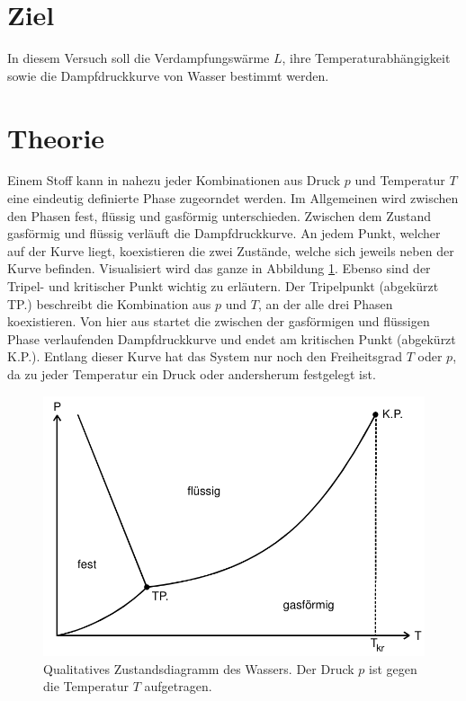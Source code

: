 \section{Ziel}
In diesem Versuch soll die Verdampfungswärme $L$, ihre Temperaturabhängigkeit sowie die Dampfdruckkurve
von Wasser bestimmt werden.
\section{Theorie}
\label{sec:Theorie}
Einem Stoff kann in nahezu jeder Kombinationen aus Druck $p$ und Temperatur $T$ eine eindeutig definierte Phase zugeorndet werden.
Im Allgemeinen wird zwischen den Phasen fest, flüssig und gasförmig unterschieden. Zwischen dem Zustand gasförmig und flüssig verläuft die
Dampfdruckkurve. An jedem Punkt, welcher auf der Kurve liegt, koexistieren die zwei Zustände, welche sich jeweils neben der Kurve befinden.
Visualisiert  wird das ganze in Abbildung \ref{fig:Zustandsdiagramm}. Ebenso sind der Tripel- und kritischer Punkt wichtig zu erläutern. Der Tripelpunkt (abgekürzt TP.) beschreibt die Kombination
aus $p$ und $T$, an der alle drei Phasen koexistieren. Von hier aus startet die zwischen der gasförmigen und flüssigen Phase verlaufenden Dampfdruckkurve und
endet am kritischen Punkt (abgekürzt K.P.). Entlang dieser Kurve hat das System nur noch den Freiheitsgrad  $T$ oder $p$, da zu jeder Temperatur ein Druck oder andersherum festgelegt ist.
\begin{figure}[h]
    \centering
    \includegraphics[scale=0.8]{"screen.jpg"}
    \caption{Qualitatives Zustandsdiagramm des Wassers. Der Druck $p$ ist gegen die Temperatur $T$ aufgetragen.\cite{V203_Anleitung}}
    \label{fig:Zustandsdiagramm}
\end{figure}
